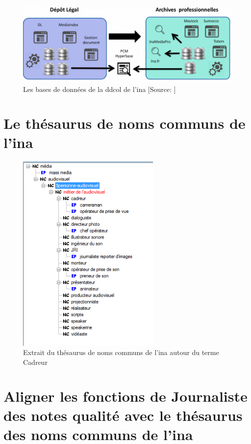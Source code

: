 \begin{figure}[!h]
	\centering
	\includegraphics[width=15cm]{images/bases_ddcol.png}
	\medskip
	\caption[Les bases de données de la \ac{ddcol} de l'\ac{ina}]{Les bases de données de la \ac{ddcol} de l'\ac{ina} [Source: \cite{poupeau_rassembler_2019}]}
	\label{bdd_ddcol_ina}
\end{figure}


\chapter{\label{annexe_thesaurus}Le thésaurus de noms communs de l'\ac{ina}}

\begin{figure}[!h]
	\centering
	\includegraphics[width=7cm]{images/cadreur_hierarchie.png}
	\medskip
	\caption[Extrait du thésaurus de noms communs de l'\ac{ina}]{Extrait du thésaurus de noms communs de l'\ac{ina} autour du terme \og Cadreur\fg{}}
	\label{thesaurus_cadreur}
\end{figure}

\chapter{\label{annexe_alignement_journaliste}Aligner les fonctions de \og Journaliste\fg{} des notes qualité avec le thésaurus des noms communs de l'\ac{ina}}

